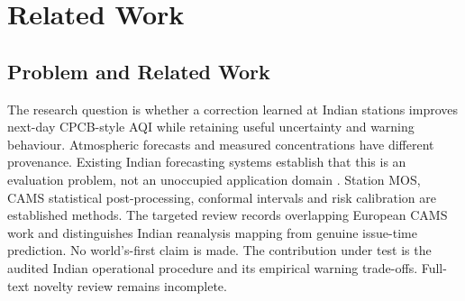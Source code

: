 \section{Related Work}
\subsection{Problem and Related Work}
The research question is whether a correction learned at Indian stations
improves next-day CPCB-style AQI while retaining useful uncertainty and warning
behaviour. Atmospheric forecasts and measured concentrations have different
provenance. Existing Indian forecasting systems establish that this is an
evaluation problem, not an unoccupied application domain \cite{jena2021delhi}.
Station MOS, CAMS statistical post-processing, conformal intervals and risk
calibration are established methods. The targeted review records overlapping
European CAMS work and distinguishes Indian reanalysis mapping from genuine
issue-time prediction. No world's-first claim is made. The contribution under
test is the audited Indian operational procedure and its empirical warning
trade-offs. Full-text novelty review remains incomplete.
